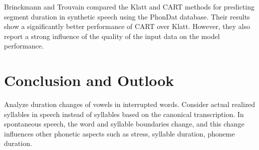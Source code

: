 \documentclass[a4paper]{scrreprt}
\begin{document}
Brinckmann and Trouvain \cite{Brinckmann_2003} compared the Klatt and CART methods for predicting segment duration in synthetic speech using the PhonDat database. Their results show a significantly better performance of CART over Klatt. However, they also report a strong influence of  the quality of the input data on the model performance.

\chapter{Conclusion and Outlook}
Analyze duration changes of vowels in interrupted words.
Consider actual realized syllables in speech instead of syllables based on the canonical transcription. In spontaneous speech, the word and syllable boundaries change, and this change influences other phonetic aspects such as stress, syllable duration, phoneme duration.

\printbibliography
\end{document}

